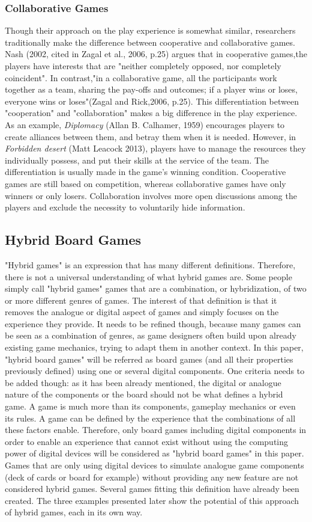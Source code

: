 \subsubsection{Collaborative Games}
Though their approach on the play experience is somewhat similar, researchers traditionally make the difference between cooperative and collaborative games. Nash (2002, cited in Zagal et al., 2006, p.25) argues that in cooperative games,the players have interests that are "neither completely opposed, nor completely coincident". In contrast,"in a collaborative game, all the participants work together as a team, sharing the pay-offs and outcomes; if a player wins or loses, everyone wins or loses"(Zagal and Rick,2006, p.25). This differentiation between "cooperation" and "collaboration" makes a big difference in the play experience. As an example, \textit{Diplomacy} (Allan B. Calhamer, 1959) encourages players to create alliances between them, and betray them when it is needed. However, in \textit{Forbidden desert} (Matt Leacock 2013), players have to manage the resources they individually possess, and put their skills at the service of the team. 
The differentiation is usually made in the game's winning condition. Cooperative games are still based on competition, whereas collaborative games have only winners or only losers. Collaboration involves more open discussions among the players and exclude the necessity to voluntarily hide information. 


\subsection{Hybrid Board Games}
"Hybrid games" is an expression that has many different definitions. Therefore, there is not a universal understanding of what hybrid games are. Some people simply call "hybrid games" games that are a combination, or hybridization, of two or more different genres of games. The interest of that definition is that it removes the analogue or digital aspect of games and simply focuses on the experience they provide. It needs to be refined though, because many games can be seen as a combination of genres, as game designers often build upon already existing game mechanics, trying to adapt them in another context. In this paper, "hybrid board games" will be referred as board games (and all their properties previously defined) using one or several digital components. One criteria needs to be added though: as it has been already mentioned, the digital or analogue nature of the components or the board should not be what defines a hybrid game. A game is much more than its components, gameplay mechanics or even its rules. A game can be defined by the experience that the combinations of all these factors enable. Therefore, only board games including digital components in order to enable an experience that cannot exist without using the computing power of digital devices will be considered as "hybrid board games" in this paper. Games that are only using digital devices to simulate analogue game components (deck of cards or board for example) without providing any new feature are not considered hybrid games. Several games fitting this definition have already been created. The three examples presented later show the potential of this approach of hybrid games, each in its own way.
